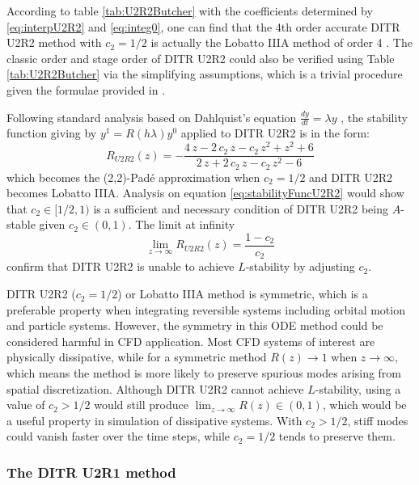 \documentclass[preprint,12pt]{elsarticle}
\begin{document}
According to table \ref{tab:U2R2Butcher} with the coefficients
determined by \eqref{eq:interpU2R2} and \eqref{eq:integ0},
one can find that the 4th order accurate
DITR U2R2 method with $c_2=1/2$
is actually the Lobatto IIIA method
of order 4 \cite{wanner1996solving}.
The classic order and stage order of DITR U2R2 could
also be verified using Table \ref{tab:U2R2Butcher} via
the simplifying assumptions, which is a trivial procedure
given the formulae provided in \cite{wanner1996solving}.

Following standard analysis based on Dahlquist's equation
$\frac{dy}{dt} = \lambda y$ \cite{wanner1996solving},
the stability function giving by $y^{1}=R(h\lambda)y^0$
applied to DITR U2R2 is in the form:
\begin{equation}
    \label{eq:stabilityFuncU2R2}
    R_{U2R2}(z) = -\frac{4\,z-2\,c_{2}\,z-c_{2}\,z^2+z^2+6}{2\,z+2\,c_{2}\,z-c_{2}\,z^2-6}
\end{equation}
which becomes the (2,2)-Pad{\'e} approximation when $c_2=1/2$ and
DITR U2R2 becomes Lobatto IIIA.
Analysis on equation \eqref{eq:stabilityFuncU2R2}
would show that $c_2\in[1/2,1)$ is a sufficient and necessary
condition of DITR U2R2 being $A$-stable given $c_2\in(0,1)$.
The limit at infinity
\begin{equation}
    \lim_{z\rightarrow\infty}R_{U2R2}(z) = \frac{1-c_2}{c_2}
\end{equation}
confirm that DITR U2R2 is unable to achieve $L$-stability
by adjusting $c_2$.


DITR U2R2 ($c_2=1/2$) or Lobatto IIIA method is symmetric,
which is a preferable property when integrating
reversible systems including orbital motion and particle
systems.
However,
the symmetry in this ODE method could be considered harmful in CFD application.
Most CFD systems of interest are physically dissipative,
while for a symmetric method
$R(z) \rightarrow 1$ when $z \rightarrow \infty$,
which means the method is more likely to preserve
spurious modes arising from spatial discretization.
Although DITR U2R2 cannot achieve $L$-stability,
using a value of $c_2 > 1/2$ would still
produce $\lim_{z\rightarrow\infty}R(z)\in(0,1)$, which
would be a useful property in simulation of dissipative systems.
With  $c_2 > 1/2$, stiff modes could vanish faster over the time
steps, while $c_2 = 1/2$ tends to preserve them.

\subsubsection{The DITR U2R1 method}
\end{document}
